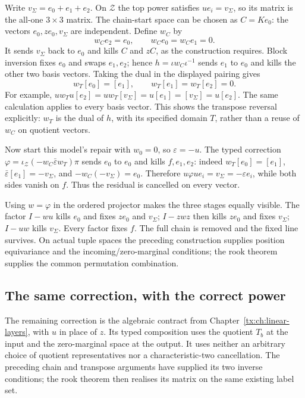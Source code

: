 \documentclass[11pt,a4paper,oneside,openany]{book}
\theoremstyle{definition}\newtheorem{definition}[theorem]{Definition}
\theoremstyle{remark}\newtheorem{remark}[theorem]{Remark}
\numberwithin{equation}{chapter}
\begin{document}
Write $v_{\Sigma}=e_0+e_1+e_2$. On $\mathcal Z$ the top power satisfies
$ue_i=v_{\Sigma}$, so its matrix is the all-one $3\times3$ matrix. The
chain-start space can be chosen as $C=Ke_0$: the vectors
$e_0,ze_0,v_{\Sigma}$ are independent. Define $w_C$ by
\[
 w_Ce_2=e_0,\qquad w_Ce_0=w_Ce_1=0.
\]
It sends $v_{\Sigma}$ back to $e_0$ and kills $C$ and $zC$, as the construction
requires. Block inversion fixes $e_0$ and swaps $e_1,e_2$; hence
$h=\iota w_C\iota^{-1}$ sends $e_1$ to $e_0$ and kills the other
two basis vectors. Taking the dual in the displayed pairing gives
\[
 w_T[e_0]=[e_1],\qquad w_T[e_1]=w_T[e_2]=0.
\]
For example, $uw_Tu[e_2]=uw_T[v_{\Sigma}]=u[e_1]=[v_{\Sigma}]=u[e_2]$.
The same calculation applies to every basis vector. This shows the
transpose reversal explicitly: $w_T$ is the dual of $h$, with its
specified domain $T$, rather than a reuse of $w_C$ on quotient vectors.

Now start this model's repair with $w_0=0$, so $\varepsilon=-u$.
The typed correction
$\varphi=\iota_{\mathcal Z}(-w_C\bar\varepsilon w_T)\pi$
sends $e_0$ to $e_0$ and kills $f,e_1,e_2$: indeed $w_T[e_0]=[e_1]$,
$\bar\varepsilon[e_1]=-v_{\Sigma}$, and $-w_C(-v_{\Sigma})=e_0$.
Therefore $u\varphi ue_i=v_{\Sigma}=-\varepsilon e_i$, while both sides
vanish on $f$. Thus the residual is cancelled on every vector.

Using $w=\varphi$ in the ordered projector makes the three stages
equally visible. The factor $I-wu$ kills $e_0$ and fixes $ze_0$ and
$v_{\Sigma}$; $I-zwz$ then kills $ze_0$ and fixes $v_{\Sigma}$; $I-uw$ kills $v_{\Sigma}$.
Every factor fixes $f$. The full chain is removed and the fixed line
survives. On actual tuple spaces the preceding construction supplies
position equivariance and the incoming/zero-marginal conditions;
the rook theorem supplies the common permutation combination.

\subsection{The same correction, with the correct power}
The remaining correction is the algebraic contract from
Chapter~\ref{tx:ch:linear-layers}, with $u$ in place of $z$.
Its typed composition uses the quotient $T_b$ at the input and the
zero-marginal space at the output. It uses neither an arbitrary choice
of quotient representatives nor a characteristic-two cancellation.
The preceding chain and transpose arguments have supplied its two
inverse conditions; the rook theorem then realises its matrix on the
same existing label set.
\end{document}
